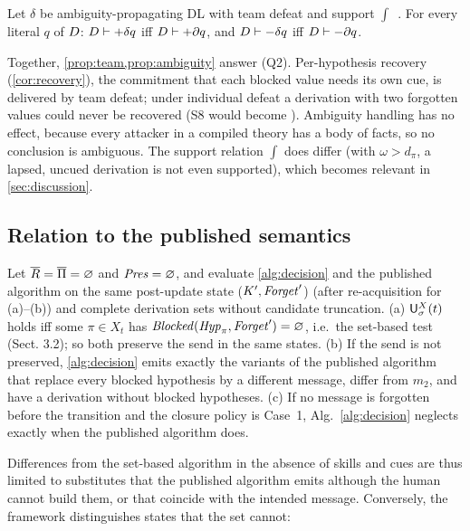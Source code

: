 \begin{proposition}\label{prop:ambiguity}
Let $\delta$ be ambiguity-propagating DL with team defeat and support $\int$~\cite{antoniou2000flexible}. For every literal $q$ of $D$: $D\vdash+\delta q$ iff $D\vdash+\partial q$, and $D\vdash-\delta q$ iff $D\vdash-\partial q$.
\end{proposition}

Together, \cref{prop:team,prop:ambiguity} answer (Q2). Per-hypothesis recovery (\cref{cor:recovery}), the commitment that each blocked value needs its own cue, is delivered by team defeat; under individual defeat a derivation with two forgotten values could never be recovered (S8 would become \skipm). Ambiguity handling has no effect, because every attacker in a compiled theory has a body of facts, so no conclusion is ambiguous. The support relation $\int$ does differ (with $\omega>d_\pi$, a lapsed, uncued derivation is not even supported), which becomes relevant in \cref{sec:discussion}.

\subsection{Relation to the published semantics}

\begin{proposition}\label{prop:conservative}
Let $\overline{R}=\overline{\Pi}=\varnothing$ and $\mathit{Pres}=\varnothing$, and evaluate \cref{alg:decision} and the published algorithm on the same post-update state ($K', \mathit{Forget}'$) (after re-acquisition for (a)–(b)) and complete derivation sets without candidate truncation. (a) $\mathsf{U}^{X}_{\sigma}(t)$ holds iff some $\pi\in X_t$ has $\mathit{Blocked}(\mathit{Hyp}_\pi,\mathit{Forget}')=\varnothing$, i.e.\ the set-based test (Sect. 3.2); so both preserve the send in the same states. (b) If the send is not preserved, \cref{alg:decision} emits exactly the variants of the published algorithm that replace every blocked hypothesis by a different message, differ from $m_2$, and have a derivation without blocked hypotheses.  (c) If no message is forgotten before the transition and the closure policy is Case~1, Alg.~\ref{alg:decision} neglects exactly when the published algorithm does.
\end{proposition}

Differences from the set-based algorithm in the absence of skills and cues are thus limited to substitutes that the published algorithm emits although the human cannot build them, or that coincide with the intended message. Conversely, the framework distinguishes states that the \Forget{} set cannot:

